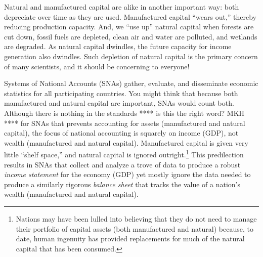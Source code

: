 Natural and manufactured capital are alike in another important way:
both depreciate over time as they are used.
Manufactured capital ``wears out,'' thereby reducing production capacity. 
And, we ``use up'' natural capital when forests are cut
down, fossil fuels are depleted, clean air and water are polluted, 
and wetlands are degraded. 
As natural capital dwindles, the future
capacity for income generation also dwindles. 
Such depletion of natural capital is the primary concern of many scientists, 
and it should be concerning to everyone!


Systems of National Accounts (SNAs) gather, evaluate, and disseminate 
economic statistics for all participating countries.
You might think that because both manufactured and natural capital are important,
SNAs would count both.
Although there is nothing in the standards **** is this the right word? MKH ****
for SNAs that prevents 
accounting for assets (manufactured and natural capital),
the focus of national accounting is squarely on income (GDP), 
not wealth (manufactured and natural capital).
Manufactured capital is given very little ``shelf space,'' 
and natural capital is ignored outright.\footnote{Nations 
	may have been lulled into believing that they 
	do not need to manage their portfolio of capital assets 
	(both manufactured and natural)
	because, to date, human ingenuity has provided replacements for much of the
	natural capital that has been consumed.}
This predilection results in SNAs that collect and analyze a trove of data to
produce a robust \emph{income statement} for the economy (GDP)
yet mostly ignore the data needed to produce a similarly rigorous
\emph{balance sheet} that tracks the value 
of a nation's wealth (manufactured and natural capital). 


